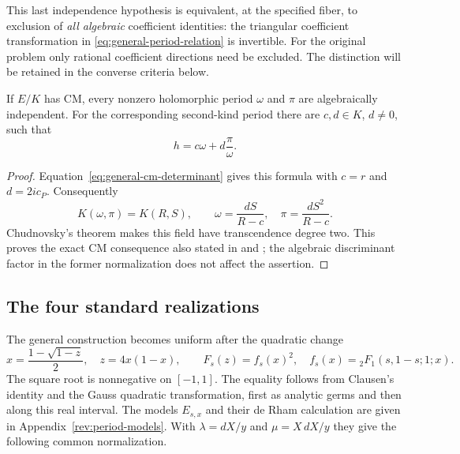 This last independence hypothesis is equivalent, at the specified
fiber, to exclusion of \emph{all algebraic} coefficient identities:
the triangular coefficient transformation in
\eqref{eq:general-period-relation} is invertible. For the original
problem only rational coefficient directions need be excluded. The
distinction will be retained in the converse criteria below.

\begin{corollary}\label{prop:B-CM-independent}
If $E/K$ has CM, every nonzero holomorphic period $\omega$ and
$\pi$ are algebraically independent. For the corresponding
second-kind period there are $c,d\in K$, $d\ne0$, such that
\begin{equation}\label{eq:B-CM-quasiperiod}
                        h=c\omega+d\frac\pi\omega.
\end{equation}
\end{corollary}
\begin{proof}
Equation~\eqref{eq:general-cm-determinant} gives this formula with
$c=r$ and $d=2ic_P$. Consequently
\[
 K(\omega,\pi)=K(R,S),\qquad
 \omega=\frac{dS}{R-c},\quad \pi=\frac{dS^2}{R-c}.
\]
Chudnovsky's theorem makes this field have transcendence degree two.
This proves the exact CM consequence also stated in
\cite[Corollary~6]{Waldschmidt} and
\cite[Corollary~32]{WaldschmidtSurvey}; the algebraic discriminant
factor in the former normalization does not affect the assertion.
\end{proof}

\subsection{The four standard realizations}\label{sec:families}
The general construction becomes uniform after the quadratic change
\begin{equation}\label{eq:clausen}
 x=\frac{1-\sqrt{1-z}}2,\quad z=4x(1-x),\qquad
 F_s(z)=f_s(x)^2,\quad f_s(x)={}_2F_1(s,1-s;1;x).
\end{equation}
The square root is nonnegative on $[-1,1]$. The equality follows
from Clausen's identity and the Gauss quadratic transformation,
first as analytic germs and then along this real interval.
The models $E_{s,x}$ and their de Rham calculation are given in
Appendix~\ref{rev:period-models}. With
$\lambda=dX/y$ and $\mu=X\,dX/y$ they give the following common
normalization.


